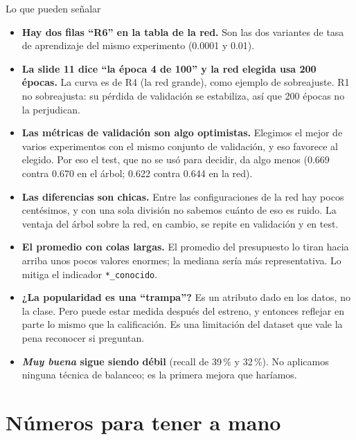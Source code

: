 \documentclass[11pt,a4paper]{article}
\begin{document}
\begin{aviso}{Lo que pueden señalar}
\begin{itemize}
  \item \textbf{Hay dos filas ``R6'' en la tabla de la red.} Son las dos variantes de tasa de aprendizaje
        del mismo experimento (0.0001 y 0.01).
  \item \textbf{La slide 11 dice ``la época 4 de 100'' y la red elegida usa 200 épocas.} La curva es de R4
        (la red grande), como ejemplo de sobreajuste. R1 no sobreajusta: su pérdida de validación se
        estabiliza, así que 200 épocas no la perjudican.
  \item \textbf{Las métricas de validación son algo optimistas.} Elegimos el mejor de varios experimentos
        con el mismo conjunto de validación, y eso favorece al elegido. Por eso el test, que no se usó para
        decidir, da algo menos (0.669 contra 0.670 en el árbol; 0.622 contra 0.644 en la red).
  \item \textbf{Las diferencias son chicas.} Entre las configuraciones de la red hay pocos centésimos, y
        con una sola división no sabemos cuánto de eso es ruido. La ventaja del árbol sobre la red, en
        cambio, se repite en validación y en test.
  \item \textbf{El promedio con colas largas.} El promedio del presupuesto lo tiran hacia arriba unos pocos
        valores enormes; la mediana sería más representativa. Lo mitiga el indicador \texttt{*\_conocido}.
  \item \textbf{¿La popularidad es una ``trampa''?} Es un atributo dado en los datos, no la clase. Pero
        puede estar medida después del estreno, y entonces reflejar en parte lo mismo que la calificación.
        Es una limitación del dataset que vale la pena reconocer si preguntan.
  \item \textbf{\textit{Muy buena} sigue siendo débil} (recall de 39\,\% y 32\,\%). No aplicamos ninguna
        técnica de balanceo; es la primera mejora que haríamos.
\end{itemize}
\end{aviso}

\section{Números para tener a mano}
\end{document}
